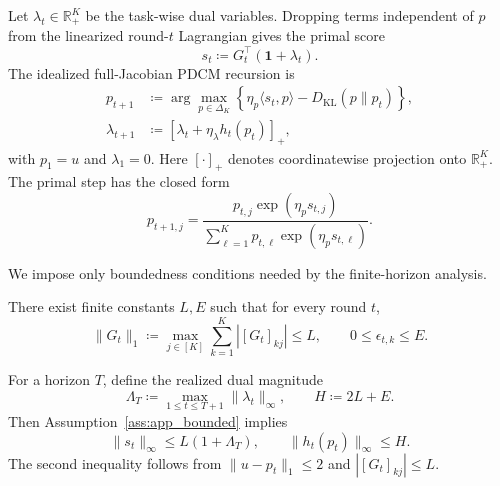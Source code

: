 Let $\lambda_t\in\mathbb{R}_+^K$ be the task-wise dual variables. Dropping terms independent of $p$ from the linearized round-$t$ Lagrangian gives the primal score
\begin{equation}
    s_t
    \coloneqq
    G_t^\top(\mathbf{1}+\lambda_t).
    \label{eq:app_score}
\end{equation}
The idealized full-Jacobian PDCM recursion is
\begin{align}
    p_{t+1}
    &\coloneqq
    \arg\max_{p\in\Delta_K}
    \left\{
        \eta_p\langle s_t,p\rangle
        -D_{\mathrm{KL}}(p\|p_t)
    \right\},
    \label{eq:app_primal_update}\\
    \lambda_{t+1}
    &\coloneqq
    \left[
        \lambda_t+\eta_\lambda h_t(p_t)
    \right]_+,
    \label{eq:app_dual_update}
\end{align}
with $p_1=u$ and $\lambda_1=0$. Here $[\cdot]_+$ denotes coordinatewise projection onto $\mathbb{R}_+^K$. The primal step has the closed form
\begin{equation}
    p_{t+1,j}
    =
    \frac{
        p_{t,j}\exp(\eta_p s_{t,j})
    }{
        \sum_{\ell=1}^K p_{t,\ell}\exp(\eta_p s_{t,\ell})
    }.
    \label{eq:app_exp_update}
\end{equation}

We impose only boundedness conditions needed by the finite-horizon analysis.

\begin{assumption}
\label{ass:app_bounded}
There exist finite constants $L,E$ such that for every round $t$,
\begin{equation}
    \|G_t\|_1
    \coloneqq
    \max_{j\in[K]}\sum_{k=1}^K |[G_t]_{kj}|
    \le L,
    \qquad
    0\le \epsilon_{t,k}\le E.
    \label{eq:app_boundedness}
\end{equation}
\end{assumption}

For a horizon $T$, define the realized dual magnitude
\begin{equation}
    \Lambda_T
    \coloneqq
    \max_{1\le t\le T+1}\|\lambda_t\|_\infty,
    \qquad
    H\coloneqq 2L+E.
    \label{eq:app_constants}
\end{equation}
Then Assumption~\ref{ass:app_bounded} implies
\begin{equation}
    \|s_t\|_\infty\le L(1+\Lambda_T),
    \qquad
    \|h_t(p_t)\|_\infty\le H.
    \label{eq:app_basic_bounds}
\end{equation}
The second inequality follows from $\|u-p_t\|_1\le 2$ and $|[G_t]_{kj}|\le L$.

